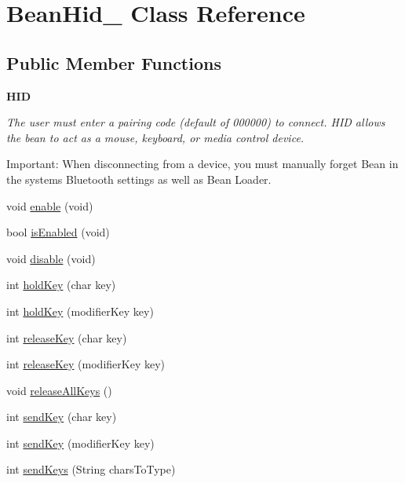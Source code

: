 \hypertarget{class_bean_hid__}{}\section{Bean\+Hid\+\_\+ Class Reference}
\label{class_bean_hid__}
\subsection*{Public Member Functions}
\begin{Indent}{\bf H\+I\+D}\par
{\em The user must enter a pairing code (default of 000000) to connect. H\+I\+D allows the bean to act as a mouse, keyboard, or media control device.

Important\+: When disconnecting from a device, you must manually forget Bean in the system\textquotesingle{}s Bluetooth settings as well as Bean Loader. }\begin{DoxyCompactItemize}
\item 
void \hyperlink{class_bean_hid___abc7bfa1befc35668b656dabc3d8646fa}{enable} (void)
\item 
bool \hyperlink{class_bean_hid___a5ddd3768219028dcee875f94855837a4}{is\+Enabled} (void)
\item 
void \hyperlink{class_bean_hid___a90eaa0e5ab96bd8e4220c4e4daa75dde}{disable} (void)
\item 
int \hyperlink{class_bean_hid___aad9dd7f6967d211abb6edb618c80e1a9}{hold\+Key} (char key)
\item 
int \hyperlink{class_bean_hid___a40083ffe2f60453c9988419b083a26ad}{hold\+Key} (modifier\+Key key)
\item 
int \hyperlink{class_bean_hid___ad0bdfc47ceedf67a923fa378048e7d2e}{release\+Key} (char key)
\item 
int \hyperlink{class_bean_hid___a41d8c234073789bcff992387f4398cac}{release\+Key} (modifier\+Key key)
\item 
void \hyperlink{class_bean_hid___a5f2464de95903311d251b9b92f5460cf}{release\+All\+Keys} ()
\item 
int \hyperlink{class_bean_hid___acf1c04f167558c6d9c11c40e1a2d1cf7}{send\+Key} (char key)
\item 
int \hyperlink{class_bean_hid___abe48bfbb4e86e3e6411ebe507e388543}{send\+Key} (modifier\+Key key)
\item 
int \hyperlink{class_bean_hid___a9421d40df77b9d1f18d5a202879063ee}{send\+Keys} (String chars\+To\+Type)
\item 

\end{DoxyCompactItemize}
\end{Indent}
